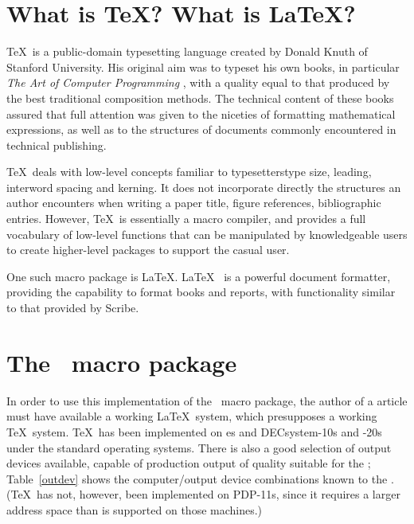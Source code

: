 \section{What is \TeX? What is \LaTeX?}

\TeX\ is a public-domain typesetting language created by Donald Knuth
of Stanford University.  His original aim was to typeset his own books,
in particular {\sl The Art of Computer Programming\/} \cite{ACP}, with
a quality equal to that produced by the best traditional composition
methods.  The technical content of these books assured that full
attention was given to the niceties of formatting mathematical
expressions, as well as to the structures of documents commonly
encountered in technical publishing.

\TeX\ deals with low-level concepts familiar to typesetters\Dash type
size, leading, interword spacing and kerning.  It does not incorporate
directly the structures an author encounters when writing a paper\Dash
title, figure references, bibliographic entries.  However, \TeX\ is
essentially a macro compiler, and provides a full vocabulary of low-level
functions that can be manipulated by knowledgeable users to create
higher-level packages to support the casual user.

One such macro package is \LaTeX.  \LaTeX\ \cite{LT} is
a powerful document formatter, providing the capability to format
books and reports, with functionality similar to that provided by
Scribe.











\section{The \DP\ macro package}

In order to use this implementation of the \DP\ macro package, the
author of a \DProc\/ article must have available a working \LaTeX\ system,
which presupposes a working \TeX\ system.
\TeX\ has been implemented on \VAX es and DECsystem-10s and -20s
under the standard operating systems.
There is also a good selection of output devices available, capable
of production output of quality suitable for the {\sl\Proc\/};
Table~\ref{outdev}
shows the computer/output device combinations known to the \TUG.
(\TeX\ has not, however, been implemented on PDP-11s, since
it requires a larger address space than is supported on those machines.)

